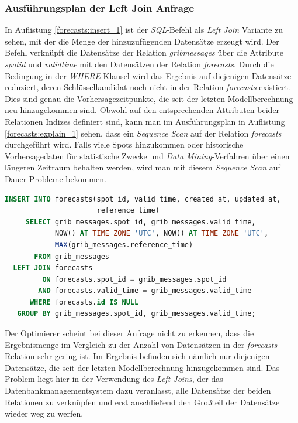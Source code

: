 \subsubsection{Ausführungsplan der Left Join Anfrage}
In Auflistung \ref{forecasts:insert_1} ist der \textit{SQL}-Befehl als
\textit{Left Join} Variante zu sehen, mit der die Menge der
hinzuzufügenden Datensätze erzeugt wird. Der Befehl verknüpft die
Datensätze der Relation \textit{grib\textunderscore messages} über die
Attribute \textit{spot\textunderscore id} und
\textit{valid\textunderscore time} mit den Datensätzen der Relation
\textit{forecasts}. Durch die Bedingung in der \textit{WHERE}-Klausel
wird das Ergebnis auf diejenigen Datensätze reduziert, deren
Schlüsselkandidat noch nicht in der Relation \textit{forecasts}
existiert. Dies sind genau die Vorhersagezeitpunkte, die seit der
letzten Modellberechnung neu hinzugekommen sind. Obwohl auf den
entsprechenden Attributen beider Relationen Indizes definiert sind,
kann man im Ausführungsplan in Auflistung \ref{forecasts:explain_1}
sehen, dass ein \textit{Sequence Scan} auf der Relation
\textit{forecasts} durchgeführt wird. Falls viele Spots hinzukommen
oder historische Vorhersagedaten für statistische Zwecke und
\textit{Data Mining}-Verfahren über einen längeren Zeitraum behalten
werden, wird man mit diesem \textit{Sequence Scan} auf Dauer Probleme
bekommen.

\begin{lstlisting}[captionpos=b, caption=Hinzufügen von Datensätze mittels \textit{Left Join}, label=forecasts:insert_1, language=SQL]
INSERT INTO forecasts(spot_id, valid_time, created_at, updated_at, 
                      reference_time)
     SELECT grib_messages.spot_id, grib_messages.valid_time, 
            NOW() AT TIME ZONE 'UTC', NOW() AT TIME ZONE 'UTC', 
            MAX(grib_messages.reference_time)
       FROM grib_messages
  LEFT JOIN forecasts
         ON forecasts.spot_id = grib_messages.spot_id
        AND forecasts.valid_time = grib_messages.valid_time
      WHERE forecasts.id IS NULL
   GROUP BY grib_messages.spot_id, grib_messages.valid_time;
\end{lstlisting}

Der Optimierer scheint bei dieser Anfrage nicht zu erkennen, dass die
Ergebnismenge im Vergleich zu der Anzahl von Datensätzen in der
\textit{forecasts} Relation sehr gering ist. Im Ergebnis befinden sich
nämlich nur diejenigen Datensätze, die seit der letzten
Modellberechnung hinzugekommen sind. Das Problem liegt hier in der
Verwendung des \textit{Left Joins}, der das Datenbankmanagementsystem
dazu veranlasst, alle Datensätze der beiden Relationen zu verknüpfen
und erst anschließend den Großteil der Datensätze wieder weg zu
werfen.

